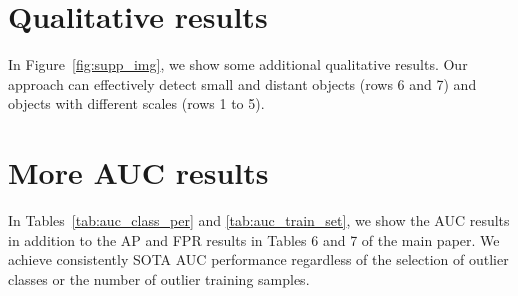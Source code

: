 \documentclass[runningheads]{llncs}
\begin{document}
\clearpage



\newpage

\beginsupplement
\setcounter{section}{0}

\setcounter{equation}{0}
\setcounter{figure}{0}
\setcounter{table}{0}
\setcounter{page}{1}
\makeatletter
\renewcommand{\theequation}{S\arabic{equation}}
\renewcommand{\thefigure}{S\arabic{figure}}
\newpage




\section{Qualitative results}




In Figure~\ref{fig:supp_img}, we show some additional qualitative results. Our approach can effectively detect small and distant objects (rows 6 and 7) and objects with different scales (rows 1 to 5). 

\section{More AUC results}

In Tables~\ref{tab:auc_class_per} and \ref{tab:auc_train_set}, we show the AUC results in addition to the AP and FPR results in Tables 6 and 7 of the main paper.  We achieve consistently SOTA AUC performance regardless of the selection of outlier classes or the number of outlier training samples. 
\end{document}
